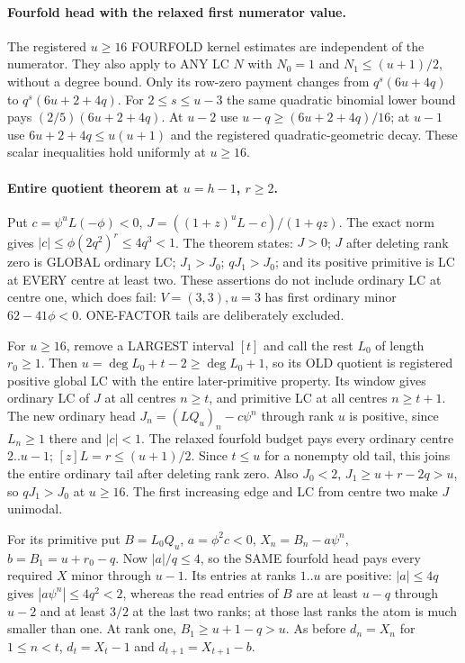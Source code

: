 \paragraph{Fourfold head with the relaxed first numerator value.}
The registered $u\ge16$ FOURFOLD kernel estimates are independent
of the numerator. They also apply to ANY LC $N$ with $N_0=1$ and
$N_1\le(u+1)/2$, without a degree bound. Only its row-zero payment
changes from $q^s(6u+4q)$ to $q^s(6u+2+4q)$.
For $2\le s\le u-3$ the same quadratic binomial lower bound pays
$(2/5)(6u+2+4q)$. At $u-2$ use
$u-q\ge(6u+2+4q)/16$; at $u-1$ use
$6u+2+4q\le u(u+1)$ and the registered quadratic-geometric decay.
These scalar inequalities hold uniformly at $u\ge16$.

\paragraph{Entire quotient theorem at $u=h-1$, $r\ge2$.}
Put $c=\psi^uL(-\phi)<0$, $J=((1+z)^uL-c)/(1+qz)$.
The exact norm gives $|c|\le\phi(2q^2)^r\le4q^3<1$.
The theorem states: $J>0$; $J$ after deleting rank zero is
GLOBAL ordinary LC; $J_1>J_0$; $qJ_1>J_0$; and its positive
primitive is LC at EVERY centre at least two.
These assertions do not include ordinary LC at centre one, which
does fail: $V=(3,3),u=3$ has first ordinary minor $62-41\phi<0$.
ONE-FACTOR tails are deliberately excluded.

For $u\ge16$, remove a LARGEST interval $[t]$ and call the rest
$L_0$ of length $r_0\ge1$. Then
$u=\deg L_0+t-2\ge\deg L_0+1$, so its OLD quotient is registered
positive global LC with the entire later-primitive property.
Its window gives ordinary LC of $J$ at all centres $n\ge t$,
and primitive LC at all centres $n\ge t+1$.
The new ordinary head $J_n=(LQ_u)_n-c\psi^n$ through rank $u$
is positive, since $L_n\ge1$ there and $|c|<1$.
The relaxed fourfold budget pays every ordinary centre $2..u-1$;
$[z]L=r\le(u+1)/2$. Since $t\le u$ for a nonempty old tail,
this joins the entire ordinary tail after deleting rank zero.
Also $J_0<2$, $J_1\ge u+r-2q>u$, so $qJ_1>J_0$ at $u\ge16$.
The first increasing edge and LC from centre two make $J$ unimodal.

For its primitive put $B=L_0Q_u$, $a=\phi^2c<0$,
$X_n=B_n-a\psi^n$, $b=B_1=u+r_0-q$.
Now $|a|/q\le4$, so the SAME fourfold head pays every required
$X$ minor through $u-1$. Its entries at ranks $1..u$ are positive:
$|a|\le4q$ gives $|a\psi^n|\le4q^2<2$, whereas the read entries
of $B$ are at least $u-q$ through $u-2$ and at least $3/2$ at
the last two ranks; at those last ranks the atom is much smaller
than one. At rank one, $B_1\ge u+1-q>u$.
As before $d_n=X_n$ for $1\le n<t$, $d_t=X_t-1$ and
$d_{t+1}=X_{t+1}-b$.

